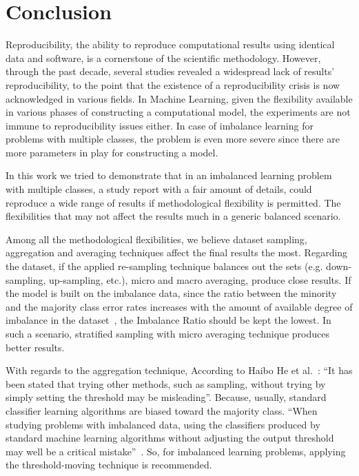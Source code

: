 \chapter{Conclusion}

Reproducibility, the ability to reproduce computational results using identical data and software, 
is a cornerstone of the scientific methodology. However, through the past decade, several studies 
revealed a widespread lack of results’ reproducibility, to the point that the existence of a 
reproducibility crisis is now acknowledged in various fields.
In Machine Learning, given the flexibility available in various phases of constructing a 
computational model, the experiments are not immune to reproducibility issues either. 
In case of imbalance learning for problems with multiple classes, the problem is even more 
severe since there are more parameters in play for constructing a model.

In this work we tried to demonstrate that in an imbalanced learning problem with multiple classes,
a study report with a fair amount of details, could reproduce a wide range of results if 
methodological flexibility is permitted. The flexibilities that may not affect the results 
much in a generic balanced scenario. 

Among all the methodological flexibilities, we believe dataset sampling, aggregation and 
averaging techniques affect the final results the most. Regarding the dataset, if the applied 
re-sampling technique balances out the sets (e.g. down-sampling, up-sampling, etc.), micro and 
macro averaging, produce close results. If the model is built on the imbalance data, since the 
ratio between the minority and the majority class error rates increases with the amount of 
available degree of imbalance in the dataset~\cite{japkowicz_concept-learning_2001}, the 
Imbalance Ratio should be kept the lowest. In such a scenario, stratified sampling with micro 
averaging technique produces better results. 

With regards to the aggregation technique, According to Haibo He et al.~\cite{haibo_he_learning_2009}: 
“It has been stated that trying other methods, such as sampling, without trying by simply setting the 
threshold may be misleading”. Because, usually, standard classifier learning algorithms are 
biased toward the majority class. “When studying problems with imbalanced data, using the 
classifiers produced by standard machine learning algorithms without adjusting the output 
threshold may well be a critical mistake”~\cite{provost_machine_2000}. So, for imbalanced 
learning problems, applying the threshold-moving technique is recommended. 

